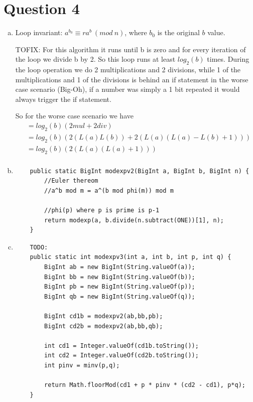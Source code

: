 \documentclass[journal,a4paper]{article}
\begin{document}
\section*{Question 4}
\begin{enumerate}[(a)]
	\item Loop invariant: $a^{b_0} \equiv ra^b\ (mod\ n)$, where $b_0$ is the original $b$ value.
	
		  TOFIX: For this algorithm it runs until b is zero and for every iteration of the loop we divide b by 2. So this loop runs at least $log_2(b)$ times. During the loop operation we do 2 multiplications and 2 divisions, while 1 of the multiplications and 1 of the divisions is behind an if statement in the worse case scenario (Big-Oh), if a number was simply a 1 bit repeated it would always trigger the if statement.
		  
		  So for the worse case scenario we have
		  \begin{align*}
		  	&= log_2(b)(2mul + 2div) \\
		  	&= log_2(b)(2(L(a)L(b)) + 2(L(a)(L(a)-L(b)+1))) \\
		  	&= log_2(b)(2(L(a)(L(a)+1))) \\
		  \end{align*}
	\item \begin{lstlisting}
	public static BigInt modexpv2(BigInt a, BigInt b, BigInt n) {
		//Euler thereom
		//a^b mod m = a^(b mod phi(m)) mod m

		//phi(p) where p is prime is p-1
		return modexp(a, b.divide(n.subtract(ONE))[1], n);
	}
	\end{lstlisting}
	
	\item \begin{lstlisting}
	TODO:
	public static int modexpv3(int a, int b, int p, int q) {
		BigInt ab = new BigInt(String.valueOf(a));
		BigInt bb = new BigInt(String.valueOf(b));
		BigInt pb = new BigInt(String.valueOf(p));
		BigInt qb = new BigInt(String.valueOf(q));

		BigInt cd1b = modexpv2(ab,bb,pb);
		BigInt cd2b = modexpv2(ab,bb,qb);

		int cd1 = Integer.valueOf(cd1b.toString());
		int cd2 = Integer.valueOf(cd2b.toString());
		int pinv = minv(p,q);

		return Math.floorMod(cd1 + p * pinv * (cd2 - cd1), p*q);
	}
	\end{lstlisting}
\end{enumerate}
\end{document}
